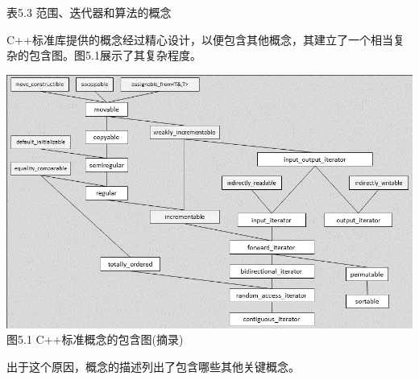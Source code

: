 \begin{center}
表5.3 范围、迭代器和算法的概念
\end{center}


C++标准库提供的概念经过精心设计，以便包含其他概念，其建立了一个相当复杂的包含图。图5.1展示了其复杂程度。

\begin{center}
\includegraphics[width=1.\textwidth]{content/chapter5/images/1.png}\\
图5.1 C++标准概念的包含图(摘录)
\end{center}

出于这个原因，概念的描述列出了包含哪些其他关键概念。



